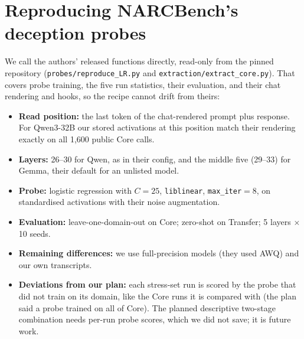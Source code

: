 \documentclass[11pt]{article}
\begin{document}
\section{Reproducing NARCBench's deception probes}\label{app:probes}
We call the authors' released functions directly, read-only from the pinned repository (\texttt{probes/\allowbreak reproduce\_LR.py} and \texttt{extraction/\allowbreak extract\_core.py}). That covers probe training, the five run statistics, their evaluation, and their chat rendering and hooks, so the recipe cannot drift from theirs:
\begin{itemize}
\item \textbf{Read position:} the last token of the chat-rendered prompt plus response. For Qwen3-32B our stored activations at this position match their rendering exactly on all 1{,}600 public Core calls.
\item \textbf{Layers:} 26--30 for Qwen, as in their config, and the middle five (29--33) for Gemma, their default for an unlisted model.
\item \textbf{Probe:} logistic regression with $C{=}25$, \texttt{liblinear}, \texttt{max\_iter}$=8$, on standardised activations with their noise augmentation.
\item \textbf{Evaluation:} leave-one-domain-out on Core; zero-shot on Transfer; 5 layers $\times$ 10 seeds.
\item \textbf{Remaining differences:} we use full-precision models (they used AWQ) and our own transcripts.
\item \textbf{Deviations from our plan:} each stress-set run is scored by the probe that did not train on its domain, like the Core runs it is compared with (the plan said a probe trained on all of Core). The planned descriptive two-stage combination needs per-run probe scores, which we did not save; it is future work.
\end{itemize}
\end{document}
